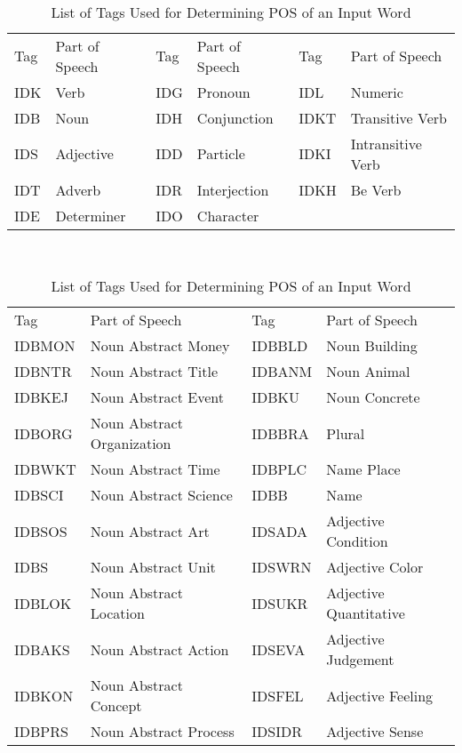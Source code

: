\documentclass[english]{nlp}
\begin{document}
\newpage
\setlength{\tabcolsep}{4pt}
\begin{table}[ht]
\caption{List of Tags Used for Determining POS of an Input Word}
~\\\vspace{-10mm}
\begin{center}
\label{table:tagstable1}
\begin{tabular}{ll||ll||ll}
\hline\noalign{\smallskip}
Tag & Part of Speech & Tag & Part of Speech & Tag & Part of Speech\\
\noalign{\smallskip}
\hline\noalign{\smallskip}
IDK & Verb & IDG & Pronoun & IDL & Numeric\\ 
IDB & Noun & IDH & Conjunction & IDKT & Transitive Verb\\
IDS & Adjective & IDD & Particle & IDKI & Intransitive Verb\\ 
IDT & Adverb & IDR & Interjection & IDKH & Be Verb\\
IDE & Determiner & IDO & Character\\ 
\hline
\end{tabular}
\end{center}
\begin{center}
~\\
\begin{tabular}{ll||ll}
\hline\noalign{\smallskip}
Tag & Part of Speech & Tag & Part of Speech\\
\noalign{\smallskip}
\hline\noalign{\smallskip}
IDBMON & Noun Abstract Money & IDBBLD & Noun Building\\
IDBNTR & Noun Abstract Title & IDBANM & Noun Animal\\
IDBKEJ & Noun Abstract Event & IDBKU & Noun Concrete\\
IDBORG & Noun Abstract Organization & IDBBRA & Plural\\
IDBWKT & Noun Abstract Time & IDBPLC & Name Place\\
IDBSCI & Noun Abstract Science & IDBB & Name \\
IDBSOS & Noun Abstract Art & IDSADA & Adjective Condition\\
IDBS  & Noun Abstract Unit  & IDSWRN & Adjective Color\\
IDBLOK & Noun Abstract Location & IDSUKR & Adjective Quantitative\\
IDBAKS & Noun Abstract Action & IDSEVA & Adjective Judgement\\
IDBKON & Noun Abstract Concept & IDSFEL & Adjective Feeling\\
IDBPRS & Noun Abstract Process & IDSIDR & Adjective Sense\\

\end{tabular}
\end{center}
\end{table}
\end{document}
